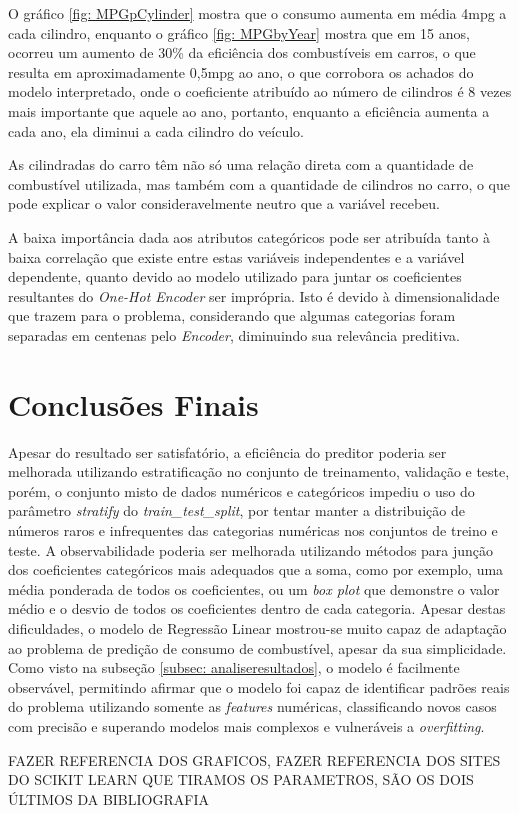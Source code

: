 \documentclass{report}
\let\oldsection\section
\renewcommand\section{\clearpage\oldsection}
\begin{document}
O gráfico \ref{fig: MPGpCylinder} mostra que o consumo aumenta em média 4mpg a cada cilindro, enquanto o gráfico \ref{fig: MPGbyYear}
mostra que em 15 anos, ocorreu um aumento de 30\% da eficiência dos combustíveis em carros, o que resulta em aproximadamente 0,5mpg ao ano,
o que corrobora os achados do modelo interpretado, onde o coeficiente atribuído ao número de cilindros é 8 vezes mais importante que aquele ao ano,
portanto, enquanto a eficiência aumenta a cada ano, ela diminui a cada cilindro do veículo.

As cilindradas do carro têm não só uma relação direta com a quantidade de combustível utilizada, mas também com a quantidade de cilindros no carro,
o que pode explicar o valor consideravelmente neutro que a variável recebeu.

A baixa importância dada aos atributos categóricos pode ser atribuída tanto à baixa correlação que existe entre estas variáveis independentes e a
variável dependente, quanto devido ao modelo utilizado para juntar os coeficientes resultantes do \textit{One-Hot Encoder} ser imprópria. Isto é devido à
dimensionalidade que trazem para o problema, considerando que algumas categorias foram separadas em centenas pelo \textit{Encoder}, diminuindo sua relevância preditiva.

\section{Conclusões Finais}
Apesar do resultado ser satisfatório, a eficiência do preditor poderia ser melhorada utilizando estratificação no conjunto de treinamento, validação e teste, porém, o conjunto misto de dados numéricos e categóricos impediu o uso do parâmetro \textit{stratify} do \textit{train\_test\_split}, por tentar manter a distribuição de números raros e infrequentes das categorias numéricas nos conjuntos de treino e teste. A observabilidade poderia ser melhorada utilizando métodos para junção dos coeficientes categóricos mais adequados que a soma, como por exemplo, uma média ponderada de todos os coeficientes, ou um \textit{box plot} que demonstre o valor médio e o desvio de todos os coeficientes dentro de cada categoria.
Apesar destas dificuldades, o modelo de Regressão Linear mostrou-se muito capaz de adaptação ao problema de predição de consumo de combustível, apesar da sua simplicidade. Como visto na subseção \ref{subsec: analiseresultados}, o modelo é facilmente observável, permitindo afirmar que o modelo foi capaz de identificar padrões reais do problema utilizando somente as \textit{features} numéricas, classificando novos casos com precisão e superando modelos mais complexos e vulneráveis a \textit{overfitting}.


FAZER REFERENCIA DOS GRAFICOS, %
FAZER REFERENCIA DOS SITES DO SCIKIT LEARN QUE TIRAMOS OS PARAMETROS, SÃO OS DOIS ÚLTIMOS DA BIBLIOGRAFIA 


\clearpage
\printbibliography
\thispagestyle{empty}
\end{document}
